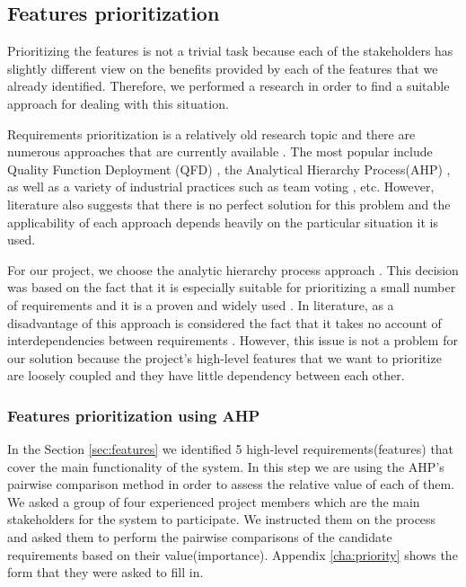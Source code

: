 \subsection{Features prioritization}

Prioritizing the features is not a trivial task because each of the stakeholders has slightly different view on the benefits provided by each of the features that we already identified. Therefore, we performed a research in order to find a suitable approach for dealing with this situation.

Requirements prioritization is a relatively old research topic and there are numerous approaches that are currently available \cite{moisiadis2002fundamentals}. The most popular include Quality Function Deployment (QFD) \cite{chan2002quality}, the Analytical Hierarchy Process(AHP) \cite{roper1990analytic} , as well as a variety of industrial practices such as team voting \cite{moisiadis2002fundamentals}, etc. However, literature also suggests that there is no perfect solution for this problem and the applicability of each approach depends heavily on the particular situation it is used.

For our project, we choose the analytic hierarchy process approach \cite{roper1990analytic}. This decision was based on the fact that it is especially suitable for prioritizing a small number of requirements\cite{karlsson1997cost} and it is a proven and widely used \cite{karlsson1998evaluation}. In literature, as a disadvantage of this approach is considered the fact that it takes no account of interdependencies between requirements \cite{roper1990analytic}. However, this issue is not a problem for our solution because the project's high-level features that we want to prioritize are loosely coupled and they have little dependency between each other. 


\subsubsection{Features prioritization using AHP}
In the Section \ref{sec:features} we identified 5 high-level requirements(features) that cover the main functionality of the system. In this step we are using the AHP's pairwise comparison method in order to assess the relative value of each of them. We asked a group of four experienced project members which are the main stakeholders for the system to participate. We instructed them on the process and asked them to perform the pairwise comparisons of the candidate requirements based on their value(importance). Appendix \ref{cha:priority} shows the form that they were asked to fill in.

